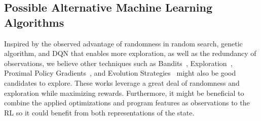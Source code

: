 \subsection{Possible Alternative Machine Learning Algorithms}
\vspace{-0.1cm}
Inspired by the observed advantage of randomness in random search, genetic algorithm, and DQN that enables more exploration, as well as the redundancy of observations, we believe other techniques such as Bandits~\cite{chapelle2011}, Exploration~\cite{bellemare2016}, Proximal Policy Gradients~\cite{schulman2017proximal}, and Evolution Strategies~\cite{salimans2017evolution} might also be good candidates to explore. These works leverage a great deal of randomness and exploration while maximizing rewards. Furthermore, it might be beneficial to combine the applied optimizations and program features as observations to the RL so it could benefit from both representations of the state.
